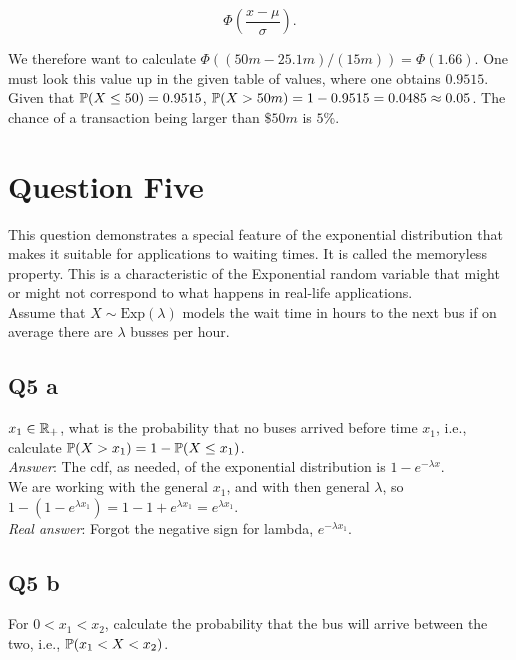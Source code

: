 \documentclass{article}
\begin{document}
        \[\Phi\left( \frac{x - \mu}{ \sigma} \right).\]

        We therefore want to calculate $\Phi((50m - 25.1m)/(15m)) = \Phi(1.66)$. One must look this value up in the given table of values, where one obtains $0.9515$.\\

        Given that $\mathbb{P}(X \leq 50) = 0.9515$, $\mathbb{P}(X > 50m) = 1-0.9515 = 0.0485 \approx 0.05$. The chance of a transaction being larger than $\$50m$ is $5\%$. \checkmark\checkmark\checkmark

    \section{Question Five}
        This question demonstrates a special feature of the exponential distribution that makes it suitable for applications to waiting times. It is called the memoryless property. This is a characteristic of the Exponential random variable that might or might not correspond to what happens in real-life applications.\\

        Assume that $X\sim\text{Exp}(\lambda)$ models the wait time in hours to the next bus if on average there are $\lambda$ busses per hour.

        \subsection{Q5 a}
            $x_1\in\mathbb{R}_+$, what is the probability that no buses arrived before time $x_1$, i.e., calculate $\mathbb{P}(X > x_1) = 1 - \mathbb{P}(X \leq x_1)$.\\

            \textit{Answer}: The cdf, as needed, of the exponential distribution is $1 - e^{-\lambda x}$.\\

            We are working with the general $x_1$, and with then general $\lambda$, so $1 - (1-e^{\lambda x_1}) = 1 - 1 + e^{\lambda x_1} = e^{\lambda x_1}$. \xmark\\

            \textit{Real answer}: Forgot the negative sign for lambda, $e^{-\lambda x_1}$.

        \subsection{Q5 b}
            For $0 < x_1 < x_2$, calculate the probability that the bus will arrive between the two, i.e., $\mathbb{P}(x_1 < X < x_2)$.\\
\end{document}
